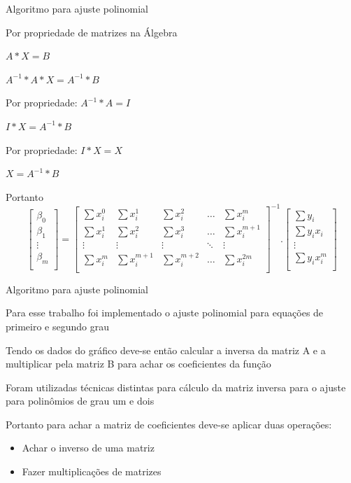 \documentclass[10pt]{beamer}
\begin{document}
\begin{frame}[fragile]{Algoritmo para ajuste polinomial}
  
  Por propriedade de matrizes na Álgebra 

  {\centering
    $A * X = B$\par
    $A^{-1} * A * X = A^{-1} * B$\par
    Por propriedade: $A^{-1} * A = I$\par
    $I * X = A^{-1} * B$\par
    Por propriedade: $I * X = X$\par
    $X = A^{-1} * B$\par
  }
  Portanto
  \[
    \begin{bmatrix}
      \beta_0 \\
      \beta_1 \\
      \vdots  \\
      \beta_m \\
    \end{bmatrix}
    =
    \begin{bmatrix}
      \sum{x_{i}^{0}} & \sum{x_{i}^{1}} & \sum{x_{i}^{2}} & \dots  & \sum{x_{i}^{m}} \\
      \sum{x_{i}^{1}} & \sum{x_{i}^{2}} & \sum{x_{i}^{3}} & \dots & \sum{x_{i}^{m+1}}\\
      \vdots & \vdots & \vdots & \ddots & \vdots \\
      \sum{x_{i}^{m}} & \sum{x_{i}^{m+1}} & \sum{x_{i}^{m+2}} & \dots  & \sum{x_{i}^{2m}} \\
    \end{bmatrix}^{-1}
    .
    \begin{bmatrix}
      \sum{y_{i}} \\
      \sum{y_{i}x_{i}}\\
      \vdots \\
      \sum{y_{i}x_{i}^{m}} \\
    \end{bmatrix}
  \]

\end{frame}

\begin{frame}[fragile]{Algoritmo para ajuste polinomial}
  
  Para esse trabalho foi implementado o ajuste polinomial para equações de primeiro e segundo grau

  Tendo os dados do gráfico deve-se então calcular a inversa da matriz A e a multiplicar pela matriz B para achar os coeficientes da função

  Foram utilizadas técnicas distintas para cálculo da matriz inversa para o ajuste para polinômios de grau um e dois  

  Portanto para achar a matriz de coeficientes deve-se aplicar duas operações:
  \begin{itemize}
    \item Achar o inverso de uma matriz
    \item Fazer multiplicações de matrizes
  \end{itemize}


\end{frame}
\end{document}
